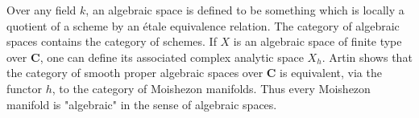 Over any field $k$, an algebraic space is defined to be something which is locally a quotient of a scheme by an étale equivalence relation. The category of algebraic spaces contains the category of schemes. If $X$ is an algebraic space of finite type over $\mathbf{C}$, one can define its associated complex analytic space $X_h$. Artin shows that the category of smooth proper algebraic spaces over $\mathbf{C}$ is equivalent, via the functor $h$, to the category of Moishezon manifolds. Thus every Moishezon manifold is "algebraic" in the sense of algebraic spaces.
